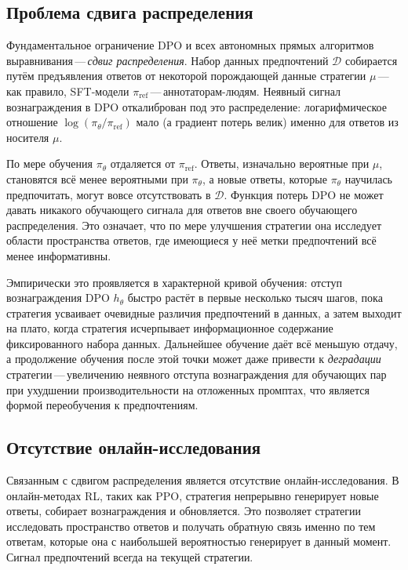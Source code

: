 \subsection{Проблема сдвига распределения}

Фундаментальное ограничение DPO и всех автономных прямых алгоритмов выравнивания\,---\,\emph{сдвиг распределения}. Набор данных предпочтений $\mathcal{D}$ собирается путём предъявления ответов от некоторой порождающей данные стратегии $\mu$\,---\,как правило, SFT-модели $\pi_\mathrm{ref}$\,---\,аннотаторам-людям. Неявный сигнал вознаграждения в DPO откалиброван под это распределение: логарифмическое отношение $\log(\pi_\theta / \pi_\mathrm{ref})$ мало (а градиент потерь велик) именно для ответов из носителя $\mu$.

По мере обучения $\pi_\theta$ отдаляется от $\pi_\mathrm{ref}$. Ответы, изначально вероятные при $\mu$, становятся всё менее вероятными при $\pi_\theta$, а новые ответы, которые $\pi_\theta$ научилась предпочитать, могут вовсе отсутствовать в $\mathcal{D}$. Функция потерь DPO не может давать никакого обучающего сигнала для ответов вне своего обучающего распределения. Это означает, что по мере улучшения стратегии она исследует области пространства ответов, где имеющиеся у неё метки предпочтений всё менее информативны.

Эмпирически это проявляется в характерной кривой обучения: отступ вознаграждения DPO $h_\theta$ быстро растёт в первые несколько тысяч шагов, пока стратегия усваивает очевидные различия предпочтений в данных, а затем выходит на плато, когда стратегия исчерпывает информационное содержание фиксированного набора данных. Дальнейшее обучение даёт всё меньшую отдачу, а продолжение обучения после этой точки может даже привести к \emph{деградации} стратегии\,---\,увеличению неявного отступа вознаграждения для обучающих пар при ухудшении производительности на отложенных промптах, что является формой переобучения к предпочтениям.

\subsection{Отсутствие онлайн-исследования}

Связанным с сдвигом распределения является отсутствие онлайн-исследования. В онлайн-методах RL, таких как PPO, стратегия непрерывно генерирует новые ответы, собирает вознаграждения и обновляется. Это позволяет стратегии исследовать пространство ответов и получать обратную связь именно по тем ответам, которые она с наибольшей вероятностью генерирует в данный момент. Сигнал предпочтений всегда на текущей стратегии.

